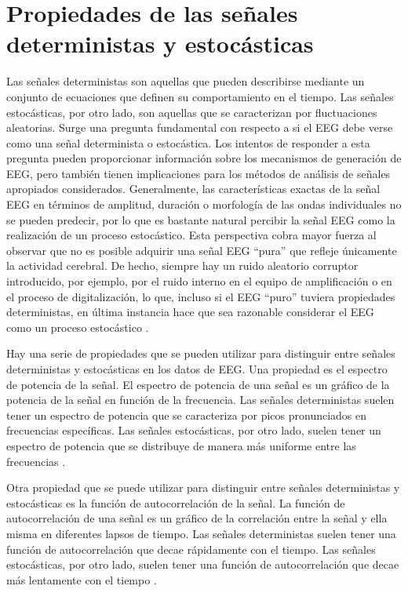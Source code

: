 \section{Propiedades de las señales deterministas y estocásticas}
Las señales deterministas son aquellas que pueden describirse mediante un conjunto de ecuaciones que definen su comportamiento en el tiempo. Las señales estocásticas, por otro lado, son aquellas que se caracterizan por fluctuaciones aleatorias.
Surge una pregunta fundamental con respecto a si el EEG debe verse como una señal determinista o estocástica. Los intentos de responder a esta pregunta pueden proporcionar información sobre los mecanismos de generación de EEG, pero también tienen implicaciones para los métodos de análisis de señales apropiados considerados. Generalmente, las características exactas de la señal EEG en términos de amplitud, duración o morfología de las ondas individuales no se pueden predecir, por lo que es bastante natural percibir la señal EEG como la realización de un proceso estocástico. Esta perspectiva cobra mayor fuerza al observar que no es posible adquirir una señal EEG ``pura'' que refleje únicamente la actividad cerebral. De hecho, siempre hay un ruido aleatorio corruptor introducido, por ejemplo, por el ruido interno en el equipo de amplificación o en el proceso de digitalización, lo que, incluso si el EEG ``puro'' tuviera propiedades deterministas, en última instancia hace que sea razonable considerar el EEG como un proceso estocástico \cite{Libro_SP_cocoro_neuro_app}.

Hay una serie de propiedades que se pueden utilizar para distinguir entre señales deterministas y estocásticas en los datos de EEG. Una propiedad es el espectro de potencia de la señal. El espectro de potencia de una señal es un gráfico de la potencia de la señal en función de la frecuencia. Las señales deterministas suelen tener un espectro de potencia que se caracteriza por picos pronunciados en frecuencias específicas. Las señales estocásticas, por otro lado, suelen tener un espectro de potencia que se distribuye de manera más uniforme entre las frecuencias \cite{Libro_SP_cocoro_neuro_app}.

Otra propiedad que se puede utilizar para distinguir entre señales deterministas y estocásticas es la función de autocorrelación de la señal. La función de autocorrelación de una señal es un gráfico de la correlación entre la señal y ella misma en diferentes lapsos de tiempo. Las señales deterministas suelen tener una función de autocorrelación que decae rápidamente con el tiempo. Las señales estocásticas, por otro lado, suelen tener una función de autocorrelación que decae más lentamente con el tiempo \cite{Libro_SP_cocoro_neuro_app}.

